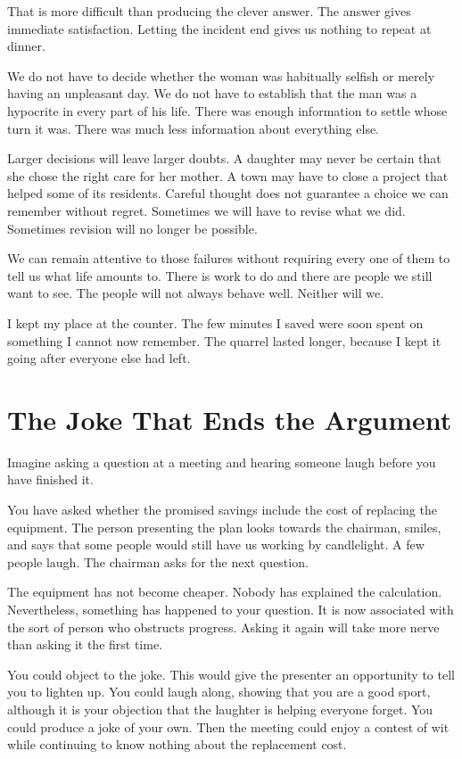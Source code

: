 \documentclass[12pt,a4paper]{book}
\begin{document}
That is more difficult than producing the clever answer. The answer gives immediate satisfaction. Letting the incident end gives us nothing to repeat at dinner.

We do not have to decide whether the woman was habitually selfish or merely having an unpleasant day. We do not have to establish that the man was a hypocrite in every part of his life. There was enough information to settle whose turn it was. There was much less information about everything else.

Larger decisions will leave larger doubts. A daughter may never be certain that she chose the right care for her mother. A town may have to close a project that helped some of its residents. Careful thought does not guarantee a choice we can remember without regret. Sometimes we will have to revise what we did. Sometimes revision will no longer be possible.

We can remain attentive to those failures without requiring every one of them to tell us what life amounts to. There is work to do and there are people we still want to see. The people will not always behave well. Neither will we.

I kept my place at the counter. The few minutes I saved were soon spent on something I cannot now remember. The quarrel lasted longer, because I kept it going after everyone else had left.

\chapter{The Joke That Ends the Argument}

Imagine asking a question at a meeting and hearing someone laugh before you have finished it.

You have asked whether the promised savings include the cost of replacing the equipment. The person presenting the plan looks towards the chairman, smiles, and says that some people would still have us working by candlelight. A few people laugh. The chairman asks for the next question.

The equipment has not become cheaper. Nobody has explained the calculation. Nevertheless, something has happened to your question. It is now associated with the sort of person who obstructs progress. Asking it again will take more nerve than asking it the first time.

You could object to the joke. This would give the presenter an opportunity to tell you to lighten up. You could laugh along, showing that you are a good sport, although it is your objection that the laughter is helping everyone forget. You could produce a joke of your own. Then the meeting could enjoy a contest of wit while continuing to know nothing about the replacement cost.
\end{document}
